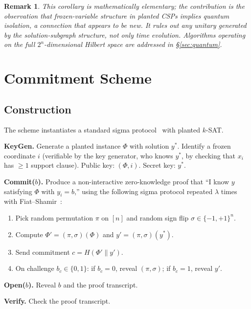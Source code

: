 \documentclass[11pt]{article}
\newtheorem{remark}[theorem]{Remark}
\begin{document}
\begin{remark}
This corollary is mathematically elementary; the contribution is the observation that frozen-variable structure in planted CSPs implies quantum isolation, a connection that appears to be new.  It rules out any unitary generated by the solution-subgraph structure, not only time evolution.  Algorithms operating on the full $2^n$-dimensional Hilbert space are addressed in \S\ref{sec:quantum}.
\end{remark}


\section{Commitment Scheme}

\subsection{Construction}

The scheme instantiates a standard sigma protocol~\cite{GMW91} with planted $k$-SAT.

\medskip\noindent\textbf{KeyGen.}  Generate a planted instance $\Phi$ with solution $y^*$.  Identify a frozen coordinate $i$ (verifiable by the key generator, who knows $y^*$, by checking that $x_i$ has $\geq 1$ support clause).  Public key: $(\Phi, i)$.  Secret key: $y^*$.

\medskip\noindent\textbf{Commit($b$).}  Produce a non-interactive zero-knowledge proof that ``I know $y$ satisfying $\Phi$ with $y_i = b$,'' using the following sigma protocol repeated $\lambda$ times with Fiat--Shamir~\cite{FS86}:
\begin{enumerate}
\item Pick random permutation $\pi$ on $[n]$ and random sign flip $\sigma \in \{-1,+1\}^n$.
\item Compute $\Phi' = (\pi, \sigma)(\Phi)$ and $y' = (\pi, \sigma)(y^*)$.
\item Send commitment $c = H(\Phi' \| y')$.
\item On challenge $b_c \in \{0,1\}$: if $b_c = 0$, reveal $(\pi,\sigma)$; if $b_c = 1$, reveal $y'$.
\end{enumerate}

\medskip\noindent\textbf{Open($b$).}  Reveal $b$ and the proof transcript.

\medskip\noindent\textbf{Verify.}  Check the proof transcript.
\end{document}

